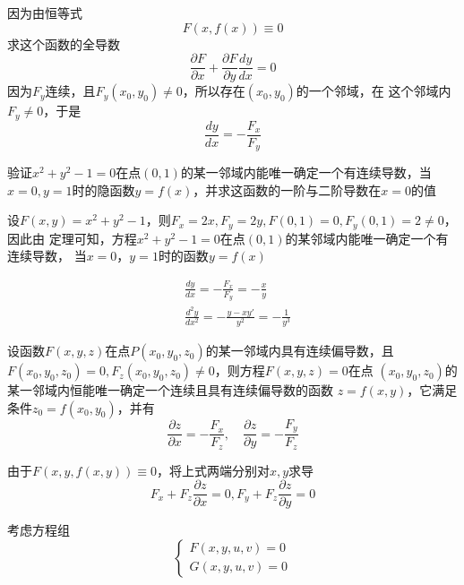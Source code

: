 \documentclass[11pt]{article}
\begin{document}
因为由恒等式
\begin{equation*}
F(x,f(x))\equiv 0
\end{equation*}
求这个函数的全导数
\begin{equation*}
\frac{\partial F}{\partial x}+\frac{\partial F}{\partial y}\frac{dy}{dx}=0
\end{equation*}
因为\(F_y\)连续，且\(F_y(x_0,y_0)\neq0\)，所以存在\((x_0,y_0)\)的一个邻域，在
这个邻域内\(F_y\neq0\)，于是
\begin{equation*}
\frac{dy}{dx}=-\frac{F_x}{F_y}
\end{equation*}


\begin{proposition}[]
验证\(x^2+y^2-1=0\)在点\((0,1)\)的某一邻域内能唯一确定一个有连续导数，当
\(x=0,y=1\)时的隐函数\(y=f(x)\)，并求这函数的一阶与二阶导数在\(x=0\)的值
\end{proposition}

\begin{proposition}[]
设\(F(x,y)=x^2+y^2-1\)，则\(F_x=2x,F_y=2y,F(0,1)=0,F_y(0,1)=2\neq0\)，因此由
定理可知，方程\(x^2+y^2-1=0\)在点\((0,1)\)的某邻域内能唯一确定一个有连续导数，
当\(x=0\)，\(y=1\)时的函数\(y=f(x)\)

\begin{align*}
&\frac{dy}{dx}=-\frac{F_x}{F_y}=-\frac{x}{y}\\
&\frac{d^2y}{dx^2}=-\frac{y-xy'}{y^2}=-\frac{1}{y^3}
\end{align*}
\end{proposition}

\begin{theorem}[隐函数存在定理 2]
设函数\(F(x,y,z)\)在点\(P(x_0,y_0,z_0)\)的某一邻域内具有连续偏导数，且
\(F(x_0,y_0,z_0)=0, F_z(x_0,y_0,z_0)\neq0\)，则方程\(F(x,y,z)=0\)在点
\((x_0,y_0,z_0)\)的某一邻域内恒能唯一确定一个连续且具有连续偏导数的函数
\(z=f(x,y)\)，它满足条件\(z_0=f(x_0,y_0)\)，并有
\begin{equation*}
\frac{\partial z}{\partial x}=-\frac{F_x}{F_z},\quad
\frac{\partial z}{\partial y}=-\frac{F_y}{F_z}
\end{equation*}
\end{theorem}

由于\(F(x,y,f(x,y))\equiv0\)，将上式两端分别对\(x,y\)求导
\begin{equation*}
F_x+F_z\frac{\partial z}{\partial x}=0,F_y+F_z\frac{\partial z}{\partial y}=0
\end{equation*}

考虑方程组
\begin{equation*}
\begin{cases}
F(x,y,u,v)=0\\
G(x,y,u,v)=0
\end{cases}
\end{equation*}
\end{document}
